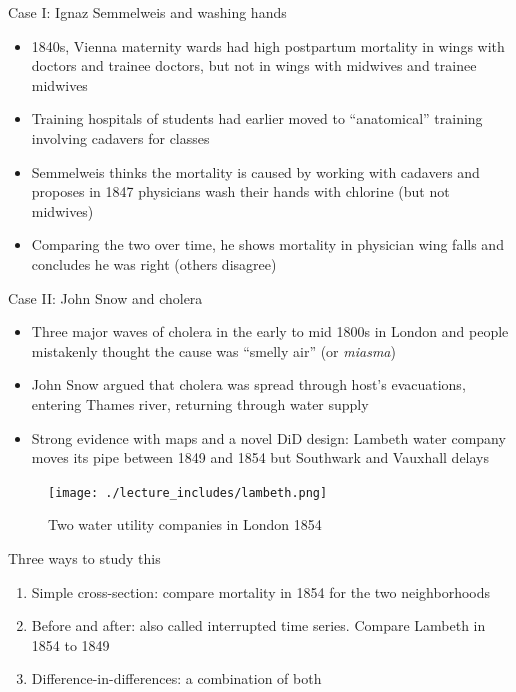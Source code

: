 \documentclass{beamer}
\begin{document}
\begin{frame}{Case I: Ignaz Semmelweis and washing hands}

\begin{itemize}
\item 1840s, Vienna maternity wards had high postpartum mortality in wings with doctors and trainee doctors, but not in wings with midwives and trainee midwives
\item Training hospitals of students had earlier moved to ``anatomical'' training involving cadavers for classes
\item Semmelweis thinks the mortality is caused by working with cadavers and proposes in 1847 physicians wash their hands with chlorine (but not midwives)
\item Comparing the two over time, he shows mortality in physician wing falls and concludes he was right (others disagree)
\end{itemize}

\end{frame}




\begin{frame}{Case II: John Snow and cholera}

\begin{itemize}
\item Three major waves of cholera in the early to mid 1800s in London and people mistakenly thought the cause was ``smelly air'' (or \emph{miasma})
\item John Snow argued that cholera was spread through host's evacuations, entering Thames river, returning through water supply
\item Strong evidence with maps and a novel DiD design: Lambeth water company moves its pipe between 1849 and 1854 but Southwark and Vauxhall delays
\end{itemize}

\end{frame}


\begin{frame}

	\begin{figure}
	\caption{Two water utility companies in London 1854}
	\texttt{[image: ./lecture\_includes/lambeth.png]}
	\end{figure}


\end{frame}


\begin{frame}{Three ways to study this}

\begin{enumerate}
\item Simple cross-section: compare mortality in 1854 for the two neighborhoods
\item Before and after: also called interrupted time series. Compare Lambeth in 1854 to 1849
\item Difference-in-differences: a combination of both
\end{enumerate}

\end{frame}
\end{document}
